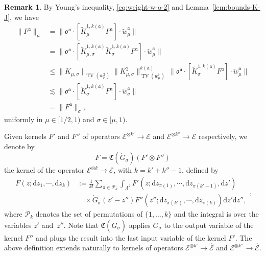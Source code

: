 \documentclass{article}
\numberwithin{equation}{section}
\newcommand{\assign}{:=}
\newcommand{\mathd}{\mathrm{d}}
\theoremstyle{plain}
\theoremstyle{definition}
\newtheorem{remark}[theorem]{Remark}
\begin{document}
\begin{remark}
  \label{rem:norm0-scale-monotonicity}By Young's inequality,
  \eqref{eq:weight-w-o-2} and Lemma~\ref{lem:bounds-K-J}, we have
  \begin{equation}
    \begin{aligned}
      \| F^{\mathfrak{a}} \|_{\mu}
      &= \| \mathfrak{o}^{\mathfrak{a}} \cdot
      [\tilde{K}^{1, k (\mathfrak{a})}_{\mu} F^{\mathfrak{a}}] \cdot
      \tilde{w}^{\mathfrak{a}}_{\mu} \|\\
      &= \| \mathfrak{o}^{\mathfrak{a}}
      \cdot [\tilde{K}^{1, k (\mathfrak{a})}_{\mu, \sigma}
      \tilde{K}^{1, k(\mathfrak{a})}_{\sigma} F^{\mathfrak{a}}] \cdot
      \tilde{w}^{\mathfrak{a}}_{\mu} \|\\
      &\leqslant \| K_{\mu, \sigma} \|_{\operatorname{TV} (w^2_{\mu})}
      \| K^2_{\mu, \sigma} \|_{\operatorname{TV}
      (w^{\flat}_{\mu})}^{k (\mathfrak{a})}\,
      \| \mathfrak{o}^{\mathfrak{a}} \cdot [\tilde{K}^{1, k
      (\mathfrak{a})}_{\sigma} F^{\mathfrak{a}}] \cdot
      \tilde{w}^{\mathfrak{a}}_{\mu} \|\\
      &\lesssim \| \mathfrak{o}^{\mathfrak{a}} \cdot [\tilde{K}^{1, k
      (\mathfrak{a})}_{\sigma} F^{\mathfrak{a}}] \cdot
      \tilde{w}^{\mathfrak{a}}_{\sigma} \|\\
      &= \| F^{\mathfrak{a}} \|_{\sigma},
    \end{aligned} \label{eq:norm-mon}
  \end{equation}
  uniformly in $\mu \in [1 / 2, 1)$ and $\sigma \in [\mu, 1)$.
\end{remark}

Given kernels $F '$ and $F''$ of operators
$\mathcal{E}^{\otimes k'} \rightarrow \mathcal{E}$ and $\mathcal{E}^{\otimes
k''} \rightarrow \mathcal{E}$ respectively, we denote by
\begin{equation}
  F =\mathfrak{C} (\dot{G}_{\sigma}) (F'  \otimes F'')
  \label{eq:frak-B-operator}
\end{equation}
the kernel of the operator $\mathcal{E}^{\otimes k} \rightarrow \mathcal{E}$,
with $k = k' + k'' - 1$, defined by
\begin{equation}
  \begin{aligned}
    F (z ; \mathd z_1, \cdots, \mathd z_k)
    &\assign \frac{1}{k!} \sum_{\pi \in \mathcal{P}_k}
    \int_{\Lambda^2}
    F'(z ; \mathd z_{\pi (1)}, \cdots,
    \mathd z_{\pi (k' - 1)}, \mathd z')\\
    &\quad \times \dot{G}_{\sigma} (z' - z'')
    F''(z'' ; \mathd z_{\pi (k')}, \cdots, \mathd z_{\pi (k)})
    \mathd z' \mathd z'',
  \end{aligned}
  , \label{eq:def-B-general}
\end{equation}
where $\mathcal{P}_k$ denotes the set of permutations of $\{ 1, \ldots, k \}$
and the integral is over the variables $z'$ and~$z''$. Note that
$\mathfrak{C}  (\dot{G}_{\sigma})$ applies $\dot{G}_{\sigma}$ to the
output variable of the kernel $F''$ and plugs the result into the last input
variable of the kernel $F'$. The above definition extends naturally to
kernels of operators $\mathcal{E}^{\otimes k'} \rightarrow \hat{\mathcal{E}}$
and $\mathcal{E}^{\otimes k''} \rightarrow \hat{\mathcal{E}}$.
\end{document}
